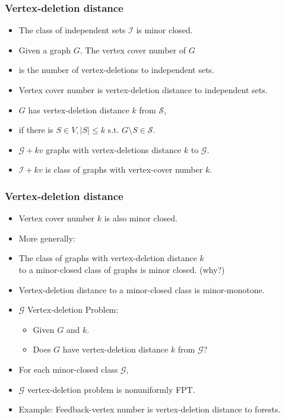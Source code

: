 \documentclass[t,usenames,dvipsnames]{beamer}
\begin{document}
\begin{frame}\frametitle{Vertex-deletion distance}
	\begin{itemize}[<+->]
		\item The class of independent sets $\mathcal{I}$ is minor closed.
		\item Given a graph $G$. The vertex cover number of $G$
		\item[] \hspace{1cm} is the number of vertex-deletions to independent sets.
		\item Vertex cover number is vertex-deletion distance to independent sets.
		\item $G$ has vertex-deletion distance $k$ from $\mathcal{S}$,
		\item[] \hspace{1cm} if there is $S \in V, |S| \leq k$ s.t. $G \setminus S \in
			\mathcal{S}$.
		\item $\mathcal{G} + k v$ graphs with vertex-deletions distance $k$ to
			$\mathcal{G}$.
		\item $\mathcal{I} + k v$ is class of graphs with vertex-cover number $k$.
	\end{itemize}
\end{frame}
\begin{frame}\frametitle{Vertex-deletion distance}
	\begin{itemize}[<+->]
		\item Vertex cover number $k$ is also minor closed.
		\item More generally:
		\item[] The class of graphs with vertex-deletion distance $k$\\
			to a minor-closed class of graphs is minor closed. (why?)
		\item Vertex-deletion distance to a minor-closed class is minor-monotone.

		\item $\mathcal{G}$ Vertex-deletion Problem:
			\begin{itemize}
				\item Given $G$ and $k$.
				\item Does $G$ have vertex-deletion distance $k$ from $\mathcal{G}$?
			\end{itemize}
		\item For each minor-closed class $\mathcal{G}$, 
		\item[] \hspace{1cm} $\mathcal{G}$ vertex-deletion problem is nonuniformly FPT.
		\item Example: Feedback-vertex number is vertex-deletion distance to forests.
	\end{itemize}
\end{frame}
\end{document}
